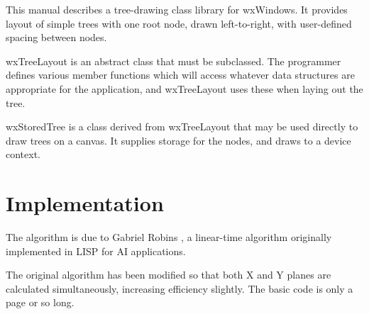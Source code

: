This manual describes a tree-drawing class library for wxWindows. It
provides layout of simple trees with one root node, drawn left-to-right,
with user-defined spacing between nodes.

wxTreeLayout is an abstract class that must be subclassed. The programmer
defines various member functions which will access whatever data structures
are appropriate for the application, and wxTreeLayout uses these when laying
out the tree.

wxStoredTree is a class derived from wxTreeLayout that may be used directly to
draw trees on a canvas. It supplies storage for the nodes, and draws
to a device context.


\chapter{Implementation}
%
\setfooter{\thepage}{}{}{}{}{\thepage}

The algorithm is due to Gabriel Robins \cite{robins87}, a linear-time
algorithm originally implemented in LISP for AI applications.

The original algorithm has been modified so that both X and Y planes
are calculated simultaneously, increasing efficiency slightly. The basic
code is only a page or so long.


%




